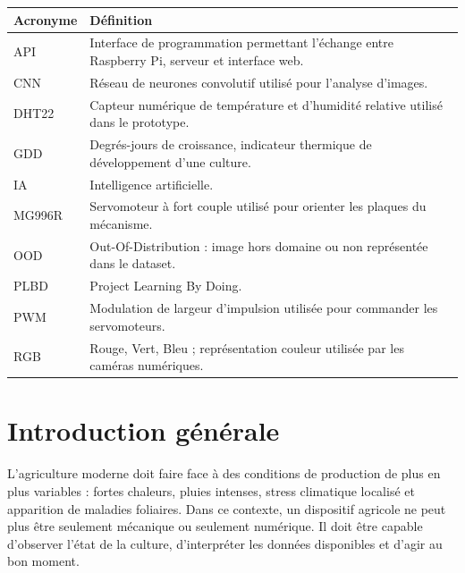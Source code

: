 ﻿\documentclass[11pt,a4paper,openany]{report}
\begin{document}
\begin{table}[H]
\centering
\large
\renewcommand{\arraystretch}{1.4}

\begin{tabular}{|p{3cm}|p{12cm}|}
\hline
\textbf{Acronyme} & \textbf{Définition} \\
\hline

API & Interface de programmation permettant l'échange entre Raspberry Pi, serveur et interface web.\\
\hline

CNN & Réseau de neurones convolutif utilisé pour l'analyse d'images.\\
\hline

DHT22 & Capteur numérique de température et d'humidité relative utilisé dans le prototype.\\
\hline

GDD & Degrés-jours de croissance, indicateur thermique de développement d'une culture.\\
\hline

IA & Intelligence artificielle.\\
\hline

MG996R & Servomoteur à fort couple utilisé pour orienter les plaques du mécanisme.\\
\hline

OOD & Out-Of-Distribution : image hors domaine ou non représentée dans le dataset.\\
\hline

PLBD & Project Learning By Doing.\\
\hline

PWM & Modulation de largeur d'impulsion utilisée pour commander les servomoteurs.\\
\hline

RGB & Rouge, Vert, Bleu ; représentation couleur utilisée par les caméras numériques.\\
\hline

\end{tabular}
\end{table}

\clearpage
{}

\chapter{Introduction générale}
L'agriculture moderne doit faire face à des conditions de production de plus en plus variables : fortes chaleurs, pluies intenses, stress climatique localisé et apparition de maladies foliaires. Dans ce contexte, un dispositif agricole ne peut plus être seulement mécanique ou seulement numérique. Il doit être capable d'observer l'état de la culture, d'interpréter les données disponibles et d'agir au bon moment.
\end{document}
